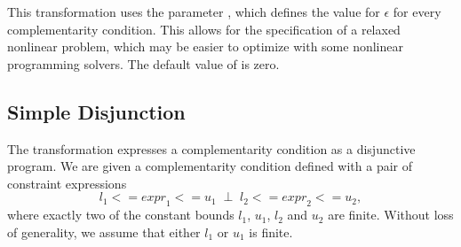 This transformation uses the parameter ,
which defines the value for $\epsilon$ for every complementarity
condition.  This allows for the specification of a relaxed nonlinear
problem, which may be easier to optimize with some nonlinear
programming solvers.
The default value of  is zero.


\subsection{Simple Disjunction}

The 
transformation expresses a complementarity condition as a disjunctive
program.  
We are given a complementarity condition defined with a pair of constraint expressions 
\[
{l}_1 <= {expr}_1 <= {u}_1 \;\;\bot\;\; {l}_2 <= {expr}_2 <= {u}_2,
\]
where exactly two of the constant bounds $l_1$, $u_1$, $l_2$ and
$u_2$ are finite.  Without loss of generality, we assume that either $l_1$ or $u_1$ is finite.

